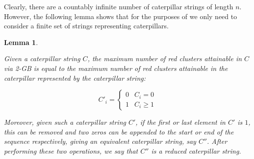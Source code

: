 \documentclass{mpaper}
\newtheorem{lemma}[theorem]{Lemma}
\begin{document}
Clearly, there are a countably infinite number of caterpillar strings of length $n$. However, the following lemma shows that for the purposes of \maxcluster we only need to consider a finite set of strings representing caterpillars.

\begin{lemma}
  \label{lem/reduced-caterpillars}

  Given a caterpillar string $C$, the maximum number of red clusters attainable in $C$ via 2-GB is equal to the maximum number of red clusters attainable in the caterpillar represented by the caterpillar string:

  \begin{equation*}
  C'_i = \begin{cases}
    0 & C_i = 0 \\
    1 & C_i \geq 1
  \end{cases}
  \end{equation*}

 Moreover, given such a caterpillar string $C'$, if the first or last element in $C'$ is $1$, this can be removed and two zeros can be appended to the start or end of the sequence respectively, giving an equivalent caterpillar string, say $C''$. After performing these two operations, we say that $C''$ is a \emph{reduced caterpillar string}.
\end{lemma}
\end{document}
